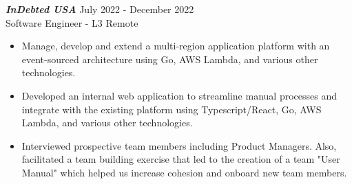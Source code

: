 {\sl \textbf{InDebted USA}} \hfill July 2022 - December 2022 \\ Software Engineer - L3 \hfill Remote
\begin{itemize}
    \item Manage, develop and extend a multi-region application platform with an event-sourced architecture using Go, AWS Lambda, and various other technologies.
    \item Developed an internal web application to streamline manual processes and integrate with the existing platform using Typescript/React, Go, AWS Lambda, and various other technologies.
    \item Interviewed prospective team members including Product Managers. Also, facilitated a team building exercise that led to the creation of a team "User Manual" which helped us increase cohesion and onboard new team members.
\end{itemize}
